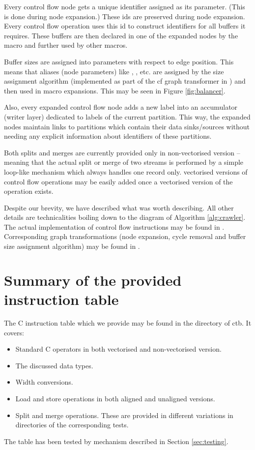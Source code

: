 Every control flow node gets a unique identifier assigned as its parameter. (This is done during node expansion.) These ids are preserved during node expansion. Every control flow operation uses this id to construct identifiers for all buffers it requires. These buffers are then declared in one of the expanded nodes by the  macro and further used by other macros.

Buffer sizes are assigned into parameters with respect to edge position. This means that aliases (node parameters) like , , etc. are assigned by the size assignment algorithm (implemented as part of the cf graph transformer in ) and then used in macro expansions. This may be seen in Figure \ref{fig:balancer}.

Also, every expanded control flow node adds a new label into an accumulator (writer layer) dedicated to labels of the current partition. This way, the expanded nodes maintain links to partitions which contain their data sinks/sources without needing any explicit information about identifiers of these partitions.

Both splits and merges are currently provided only in non-vectorised version -- meaning that the actual split or merge of two streams is performed by a simple loop-like mechanism which always handles one record only. vectorised versions of control flow operations may be easily added once a vectorised version of the  operation exists.

Despite our brevity, we have described what was worth describing. All other details are technicalities boiling down to the diagram of Algorithm \ref{alg:crawler}. The actual implementation of control flow instructions may be found in . Corresponding graph transformations (node expansion, cycle removal and buffer size assignment algorithm) may be found in .

\section{ Summary of the provided instruction table }

The C instruction table which we provide may be found in the  directory of ctb. It covers:
\begin{itemize}
  \item Standard C operators in both vectorised and non-vectorised version.
  \item The discussed data types.
  \item Width conversions.
  \item Load and store operations in both aligned and unaligned versions.
  \item Split and merge operations. These are provided in different variations in directories of the corresponding tests. 
\end{itemize}

The table has been tested by mechanism described in Section \ref{sec:testing}.


